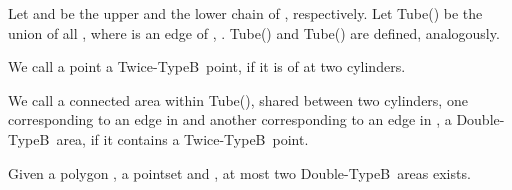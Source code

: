 \documentclass[a4paper,UKenglish]{lipics}
\newcommand{\DoubleB}{Double-TypeB}
\begin{document}
\newcommand{\TwiceB}{Twice-TypeB}
\newcommand{\Upper}{\pi}
\newcommand{\Lower}{\mu}



































\newcommand{\Rival}{Rival}

Let  and  be the upper 
and the lower chain of , respectively.  
Let Tube() be the union of all , 
where  is an edge of , .
Tube() and Tube() are defined, analogously.


\begin{definition}
We call a point a  \TwiceB ~point, 
if it is of  at two cylinders.
\end{definition}

\begin{definition}

We call a connected area within Tube(),
shared between two cylinders, one corresponding 
to an edge in  and another corresponding to 
an edge in , a \DoubleB~area, 
if it contains a \TwiceB ~point. 
\end{definition}


\begin{lemma}\label{lemma:twice}
Given a polygon , a pointset  
and , at most two \DoubleB~areas  exists.  
\end{lemma}
\end{document}
